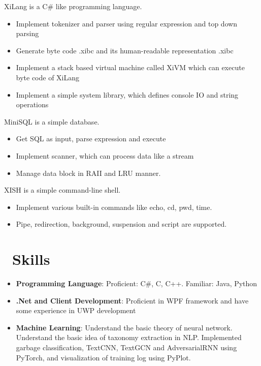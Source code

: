\documentclass{resume}
\begin{document}
XiLang is a C\# like programming language.
\begin{itemize}
  \item Implement tokenizer and parser using regular expression and top down parsing
  \item Generate byte code .xibc and its human-readable representation .xibc
  \item Implement a stack based virtual machine called XiVM which can execute byte code of XiLang
  \item Implement a simple system library, which defines console IO and string operations
\end{itemize}

MiniSQL is a simple database.
\begin{itemize}
  \item Get SQL as input, parse expression and execute
  \item Implement scanner, which can process data like a stream
  \item Manage data block in RAII and LRU manner.
\end{itemize}

XISH is a simple command-line shell.
\begin{itemize}
  \item Implement various built-in commands like echo, cd, pwd, time.
  \item Pipe, redirection, background, suspension and script are supported.
\end{itemize}

\section{\faCogs\ Skills}
\begin{itemize}[parsep=0.25ex]
    \item \textbf{Programming Language}:
        Proficient: C\#, C, C++. Familiar: Java, Python

    \item \textbf{.Net and Client Development}:
        Proficient in WPF framework and have some experience in UWP development

    \item \textbf{Machine Learning}:
        Understand the basic theory of neural network. Understand the basic idea of taxonomy extraction in NLP.
        Implemented garbage classification, TextCNN, TextGCN and AdversarialRNN using PyTorch,
        and visualization of training log using PyPlot.
    
\end{itemize}
\end{document}
